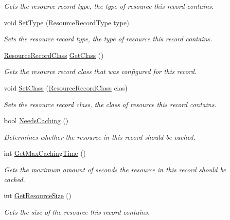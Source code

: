 \begin{DoxyCompactItemize}
\begin{DoxyCompactList}\small\item\em Gets the resource record type, the type of resource this record contains. \end{DoxyCompactList}\item 
void \hyperlink{class_senergy_1_1_dns_1_1_resource_record_ac339b08bf936f1971de6b24b46dd5813}{Set\-Type} (\hyperlink{namespace_senergy_1_1_dns_a590bfd748c955364770f5ce358d9dfe0}{Resource\-Record\-Type} type)
\begin{DoxyCompactList}\small\item\em Sets the resource record type, the type of resource this record contains. \end{DoxyCompactList}\item 
\hyperlink{namespace_senergy_1_1_dns_a953f153bc411213d621d00c1e1b3eb9d}{Resource\-Record\-Class} \hyperlink{class_senergy_1_1_dns_1_1_resource_record_a5b26da86b8ba4d6c0899dc56a9fee7c1}{Get\-Class} ()
\begin{DoxyCompactList}\small\item\em Gets the resource record class that was configured for this record. \end{DoxyCompactList}\item 
void \hyperlink{class_senergy_1_1_dns_1_1_resource_record_a4fca01c4e494f21c574e5c2bc382f3a3}{Set\-Class} (\hyperlink{namespace_senergy_1_1_dns_a953f153bc411213d621d00c1e1b3eb9d}{Resource\-Record\-Class} clas)
\begin{DoxyCompactList}\small\item\em Sets the resource record class, the class of resource this record contains. \end{DoxyCompactList}\item 
bool \hyperlink{class_senergy_1_1_dns_1_1_resource_record_ab90850f8b050337867261a55a2e43284}{Needs\-Caching} ()
\begin{DoxyCompactList}\small\item\em Determines whether the resource in this record should be cached. \end{DoxyCompactList}\item 
int \hyperlink{class_senergy_1_1_dns_1_1_resource_record_ab391deab6827e4e772809a3d025abb31}{Get\-Max\-Caching\-Time} ()
\begin{DoxyCompactList}\small\item\em Gets the maximum amount of seconds the resource in this record should be cached. \end{DoxyCompactList}\item 
int \hyperlink{class_senergy_1_1_dns_1_1_resource_record_affea007cc6d81a8a2dd80148c3386c62}{Get\-Resource\-Size} ()
\begin{DoxyCompactList}\small\item\em Gets the size of the resource this record contains. \end{DoxyCompactList}\end{DoxyCompactItemize}
